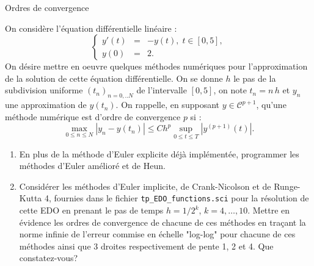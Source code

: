 \documentclass[a4paper,12pt,reqno]{amsart}
\begin{document}
\begin{exo} Ordres de convergence

On consid\`ere l'\'equation diff\'erentielle lin\'eaire :
$$
\left\{
\begin{array}{rcl}
y'(t)&=&-y(t), \; t \in [0,5],\\
y(0)&=&2.
\end{array}
\right.
$$
On d\'esire mettre en oeuvre quelques m\'ethodes num\'eriques pour l'approximation de la solution de cette \'equation diff\'erentielle. 
On se donne $h$ le pas de la subdivision uniforme $(t_n)_{n=0,..N}$ de l'intervalle $[0,5]$, on note $t_n=n\, h$ et $y_n$ une approximation de $y(t_n)$. On rappelle, en supposant $y \in {\mathcal{C}}^{p+1}$, qu'une m\'ethode num\'erique est d'ordre de convergence $p$ si :
$$
\max_{0 \leq n \leq N} |y_n-y(t_n)|\leq C h^p \sup_{0 \leq t \leq T} |y^{(p+1)}(t)|.
$$
\begin{enumerate}
\item En plus de la m\'ethode d'Euler explicite d\'ej\`a impl\'ement\'ee, programmer les m\'ethodes d'Euler am\'elior\'e et de Heun.
\item Consid\'erer les m\'ethodes d'Euler implicite, de Crank-Nicolson et de Runge-Kutta 4, fournies dans le fichier {\tt tp\_EDO\_functions.sci} pour la r\'esolution de cette EDO en prenant le pas de temps $h=1/2^k$, $k=4,\dots,10$. 
Mettre en \'evidence  les ordres de convergence de chacune de ces m\'ethodes en tra\c cant la norme infinie de l'erreur commise en \'echelle "log-log" pour chacune de ces m\'ethodes ainsi que 3 droites respectivement de pente 1, 2 et 4. 
Que constatez-vous?
\end{enumerate}
\end{exo}
\end{document}
